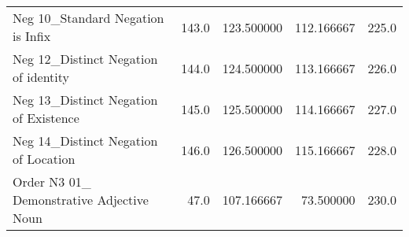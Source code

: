 \begin{tabular}{lrrrr}
Neg 10\_Standard Negation is Infix                  &     143.0 &  123.500000 &  112.166667 &        225.0 \\
Neg 12\_Distinct Negation of identity               &     144.0 &  124.500000 &  113.166667 &        226.0 \\
Neg 13\_Distinct Negation of Existence              &     145.0 &  125.500000 &  114.166667 &        227.0 \\
Neg 14\_Distinct Negation of Location               &     146.0 &  126.500000 &  115.166667 &        228.0 \\
Order N3 01\_ Demonstrative Adjective Noun          &      47.0 &  107.166667 &   73.500000 &        230.0 \\
\bottomrule
\end{tabular}

